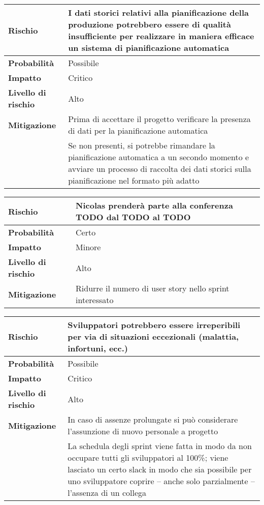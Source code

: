 \begin{table}[H]
  \begin{tabularx}{\textwidth}{lX}
    \toprule
    \textbf{Rischio} & \textbf{I dati storici relativi alla pianificazione della produzione potrebbero essere di qualità insufficiente per realizzare in maniera efficace un sistema di pianificazione automatica} \\
    \midrule
    \textbf{Probabilità} & Possibile \\
    \textbf{Impatto} & Critico \\
    \textbf{Livello di rischio} & Alto \\
    \textbf{Mitigazione} & Prima di accettare il progetto verificare la presenza di dati per la pianificazione automatica \\
    & Se non presenti, si potrebbe rimandare la pianificazione automatica a un secondo momento e avviare un processo di raccolta dei dati storici sulla pianificazione nel formato più adatto \\
    \bottomrule
  \end{tabularx}
\end{table}

\begin{table}[H]
  \begin{tabularx}{\textwidth}{lX}
    \toprule
    \textbf{Rischio} & \textbf{Nicolas prenderà parte alla conferenza TODO dal TODO al TODO} \\
    \midrule
    \textbf{Probabilità} & Certo \\
    \textbf{Impatto} & Minore \\
    \textbf{Livello di rischio} & Alto \\
    \textbf{Mitigazione} & Ridurre il numero di user story nello sprint interessato \\
    \bottomrule
  \end{tabularx}
\end{table}

\begin{table}[H]
  \begin{tabularx}{\textwidth}{lX}
    \toprule
    \textbf{Rischio} & \textbf{Sviluppatori potrebbero essere irreperibili per via di situazioni eccezionali (malattia, infortuni, ecc.)} \\
    \midrule
    \textbf{Probabilità} & Possibile \\
    \textbf{Impatto} & Critico \\
    \textbf{Livello di rischio} & Alto \\
    \textbf{Mitigazione} & In caso di assenze prolungate si può considerare l'assunzione di nuovo personale a progetto \\
    & La schedula degli sprint viene fatta in modo da non occupare tutti gli sviluppatori al 100\%; viene lasciato un certo slack in modo che sia possibile per uno sviluppatore coprire -- anche solo parzialmente -- l'assenza di un collega \\
    \bottomrule
  \end{tabularx}
\end{table}
